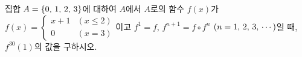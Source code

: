 \hspace*{2mm}\begin{minipage}[t]{\dimexpr\linewidth-2mm\relax}\vspace{0pt}
집합 $A=\{0,\mkern3mu 1,\mkern3mu 2,\mkern3mu 3\}$에 대하여 $A$에서 $A$로의 함수 $f(x)$가 $f(x)=\begin{cases} x+1 & (x\le 2) \\ 0 & (x=3) \end{cases}$이고 $f^1=f$, $f^{n+1}=f\circ f^n$ $(n=1,\mkern3mu 2,\mkern3mu 3,\mkern3mu \cdots)$일 때, $f^{30}(1)$의 값을 구하시오.\end{minipage}
